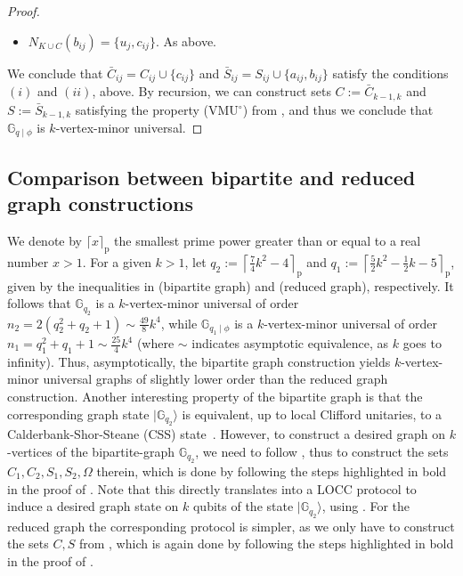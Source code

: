 \documentclass[10pt,a4paper]{article}
\newcommand{\ket}[1]{{\ensuremath{\lvert#1\rangle}}}
\newcommand{\G}[1][q]{\mathbb{G}_{#1}}
\newcommand{\Gphi}[1][q]{\mathbb{G}_{#1\mid\phi}}
\begin{document}
\begin{proof}
\begin{itemize}
        \item $N_{K \cup C}(b_{ij}) = \{u_{j}, c_{ij}\}$. As above.
    \end{itemize}
    
    We conclude that $\bar{C}_{ij} = C_{ij} \cup\{c_{ij}\}$ and $\bar{S}_{ij} = S_{ij} \cup\{a_{ij}, b_{ij}\}$ satisfy the conditions $(i)$ and $(ii)$, above. By recursion, we can construct sets $C := \bar{C}_{k-1,k}$ and $S := \bar{S}_{k-1,k}$ satisfying the property (VMU$^\circ$) from , and thus we conclude that $\Gphi$ is  $k$-vertex-minor universal.
\end{proof}

\subsection{Comparison between bipartite  and  reduced graph constructions}
\label{subsec:comparison-bipartite-reduced}

We denote by $\lceil x \rceil_\text{p}$ the smallest prime power greater than or equal to a real number $x > 1$. For a given $k > 1$, let $q_{2} := \left\lceil \frac{7}{4} k^2 - 4\right\rceil_\text{p}$ and $q_{1} := \left\lceil \frac{5}{2} k^2 - \frac{1}{2} k - 5\right\rceil_\text{p}$, given by the inequalities in  (bipartite graph) and  (reduced graph), respectively. It follows that $\G[q_2]$ is a $k$-vertex-minor universal of order $n_2 = 2(q_2^2+q_2+1) \sim \frac{49}{8}k^4$, while $\Gphi[q_1]$ is a $k$-vertex-minor universal of order $n_1 = q_1^2+q_1+1 \sim \frac{25}{4}k^4$  (where $\sim$ indicates asymptotic equivalence, as $k$ goes to infinity). Thus, asymptotically, the bipartite graph construction yields $k$-vertex-minor universal graphs of slightly lower order than the reduced graph construction. Another interesting property of the  bipartite graph  is that the corresponding graph state $\ket{\G[q_2]}$ is equivalent, up to local Clifford unitaries, to a Calderbank-Shor-Steane (CSS) state~\cite[Section~IV]{chen2004multi}. However,  to construct a desired graph on $k$-vertices of the bipartite-graph $\G[q_2]$, we need to follow , thus to construct the sets $C_1, C_2, S_1, S_2, \Omega$ therein, which is done by following the steps highlighted in bold in the proof of . Note that this directly translates into a LOCC protocol to induce a desired graph state on $k$ qubits of the state $\ket{\G[q_2]}$, using  . For the reduced graph  the corresponding protocol is simpler, as we only have to construct the sets $C, S$ from , which is again  done by following the steps highlighted in bold in the proof of .
\end{document}
